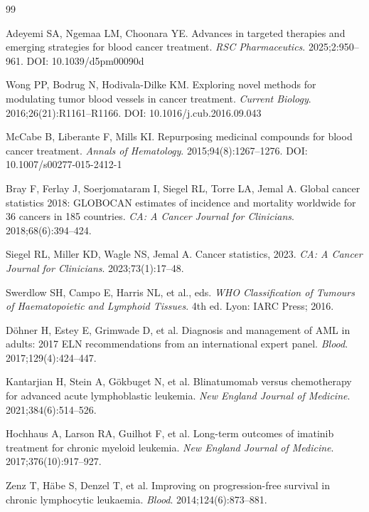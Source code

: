 ﻿\documentclass[12pt,a4paper]{article}
\theoremstyle{definition}
\begin{document}
\begin{thebibliography}{99}

  Adeyemi SA, Ngemaa LM, Choonara YE.
  Advances in targeted therapies and emerging strategies for blood cancer treatment.
  \textit{RSC Pharmaceutics}. 2025;2:950--961.
  \newblock DOI: 10.1039/d5pm00090d

  Wong PP, Bodrug N, Hodivala-Dilke KM.
  Exploring novel methods for modulating tumor blood vessels in cancer treatment.
  \textit{Current Biology}. 2016;26(21):R1161--R1166.
  \newblock DOI: 10.1016/j.cub.2016.09.043

  McCabe B, Liberante F, Mills KI.
  Repurposing medicinal compounds for blood cancer treatment.
  \textit{Annals of Hematology}. 2015;94(8):1267--1276.
  \newblock DOI: 10.1007/s00277-015-2412-1

  Bray F, Ferlay J, Soerjomataram I, Siegel RL, Torre LA, Jemal A.
  Global cancer statistics 2018: GLOBOCAN estimates of incidence and mortality
  worldwide for 36 cancers in 185 countries.
  \textit{CA: A Cancer Journal for Clinicians}. 2018;68(6):394--424.

  Siegel RL, Miller KD, Wagle NS, Jemal A.
  Cancer statistics, 2023.
  \textit{CA: A Cancer Journal for Clinicians}. 2023;73(1):17--48.

  Swerdlow SH, Campo E, Harris NL, et al., eds.
  \textit{WHO Classification of Tumours of Haematopoietic and Lymphoid Tissues}.
  4th ed. Lyon: IARC Press; 2016.

  Döhner H, Estey E, Grimwade D, et al.
  Diagnosis and management of AML in adults: 2017 ELN recommendations from an
  international expert panel.
  \textit{Blood}. 2017;129(4):424--447.

  Kantarjian H, Stein A, Gökbuget N, et al.
  Blinatumomab versus chemotherapy for advanced acute lymphoblastic leukemia.
  \textit{New England Journal of Medicine}. 2021;384(6):514--526.

  Hochhaus A, Larson RA, Guilhot F, et al.
  Long-term outcomes of imatinib treatment for chronic myeloid leukemia.
  \textit{New England Journal of Medicine}. 2017;376(10):917--927.

  Zenz T, Häbe S, Denzel T, et al.
  Improving on progression-free survival in chronic lymphocytic leukaemia.
  \textit{Blood}. 2014;124(6):873--881.


\end{thebibliography}
\end{document}
